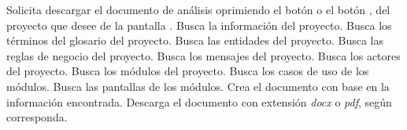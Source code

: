  \begin{UCtrayectoria}
    \UCpaso[\UCactor] Solicita descargar el documento de análisis oprimiendo el botón \btnPDF o el botón \btnWord, del proyecto que desee de la pantalla .
    \UCpaso[\UCsist] Busca la información del proyecto.
    \UCpaso[\UCsist] Busca los términos del glosario del proyecto.
    \UCpaso[\UCsist] Busca las entidades del proyecto.
    \UCpaso[\UCsist] Busca las reglas de negocio del proyecto.
    \UCpaso[\UCsist] Busca los mensajes del proyecto.
    \UCpaso[\UCsist] Busca los actores del proyecto.
    \UCpaso[\UCsist] Busca los módulos del proyecto.
    \UCpaso[\UCsist] Busca los casos de uso de los módulos.
    \UCpaso[\UCsist] Busca las pantallas de los módulos.
    \UCpaso[\UCsist] Crea el documento con base en la información encontrada.
	\UCpaso[\UCsist] Descarga el documento con extensión {\it docx} o {\it pdf}, según corresponda.
 \end{UCtrayectoria}
 
